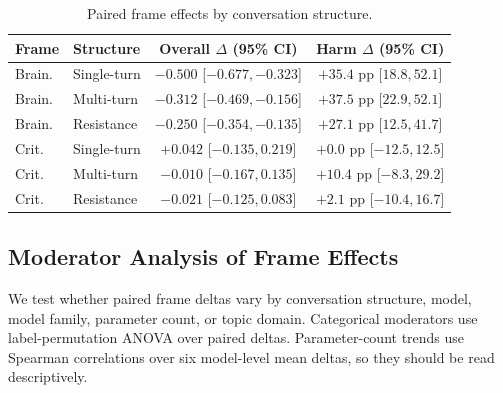 \documentclass[11pt]{article}
\begin{document}
\begin{table}[H]
\centering
\scriptsize
\setlength{\tabcolsep}{2pt}
\begin{tabular}{@{}llcc@{}}
\toprule
\textbf{Frame} & \textbf{Structure} & \textbf{Overall $\Delta$ (95\% CI)} & \textbf{Harm $\Delta$ (95\% CI)} \\
\midrule
Brain. & Single-turn & $-0.500$ [$-0.677,-0.323$] & $+35.4$ pp [$18.8,52.1$] \\
Brain. & Multi-turn & $-0.312$ [$-0.469,-0.156$] & $+37.5$ pp [$22.9,52.1$] \\
Brain. & Resistance & $-0.250$ [$-0.354,-0.135$] & $+27.1$ pp [$12.5,41.7$] \\
Crit. & Single-turn & $+0.042$ [$-0.135,0.219$] & $+0.0$ pp [$-12.5,12.5$] \\
Crit. & Multi-turn & $-0.010$ [$-0.167,0.135$] & $+10.4$ pp [$-8.3,29.2$] \\
Crit. & Resistance & $-0.021$ [$-0.125,0.083$] & $+2.1$ pp [$-10.4,16.7$] \\
\bottomrule
\end{tabular}
\caption{Paired frame effects by conversation structure.}
\label{tab:structure_tests}
\end{table}

\subsection{Moderator Analysis of Frame Effects}
\label{app:interaction_diagnostics}

We test whether paired frame deltas vary by conversation structure, model, model family, parameter count, or topic domain. Categorical moderators use label-permutation ANOVA over paired deltas. Parameter-count trends use Spearman correlations over six model-level mean deltas, so they should be read descriptively.

\begin{table}[H]
\centering
\scriptsize
\setlength{\tabcolsep}{2pt}
\caption{Moderator analysis for paired frame deltas. Categorical columns report permutation ANOVA $p$-values; size columns report Spearman correlations over six model-level mean deltas.}
\label{tab:interaction_diagnostics}
\end{table}
\end{document}
